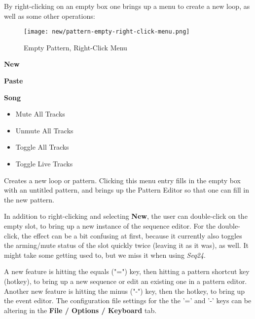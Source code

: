    By right-clicking on an empty box one brings up a menu to create
   a new loop, as well as some other operations:

\begin{figure}[H]
   \centering 
   \texttt{[image: new/pattern-empty-right-click-menu.png]}
   \caption{Empty Pattern, Right-Click Menu}
   \label{fig:pattern_window_empty_right_click}
\end{figure}

   \begin{enumber}
      \item \textbf{New}
      \item \textbf{Paste}
      \item \textbf{Song}
      \begin{itemize}
         \item {Mute All Tracks}
         \item {Unmute All Tracks}
         \item {Toggle All Tracks}
         \item {Toggle Live Tracks}
      \end{itemize}
   \end{enumber}

   \setcounter{ItemCounter}{0}      %

   Creates a new loop or pattern.
   Clicking this menu entry fills in the empty box with an untitled
   pattern, and brings up the Pattern Editor
   so that one can fill in the new pattern.

   In addition to right-clicking and selecting \textbf{New}, the user can
   double-click on the empty slot, to bring up a new instance of the sequence
   editor.  For the double-click, the effect can be a bit confusing at first,
   because it currently also toggles the arming/mute status of the slot
   quickly twice (leaving it as it was), as well.  It might take some getting
   used to, but we miss it when using \textsl{Seq24}.

   A new feature is hitting the equals ("=") key, then hitting
   a pattern shortcut key (hotkey), to bring up a new sequence or edit an
   existing one in a pattern editor.  Another new feature is hitting the minus
   ("-") key, then the hotkey, to bring up the event editor.  The
   configuration file settings for the the '=' and
   '-' keys can be altering in the \textbf{File / Options / Keyboard} tab.

